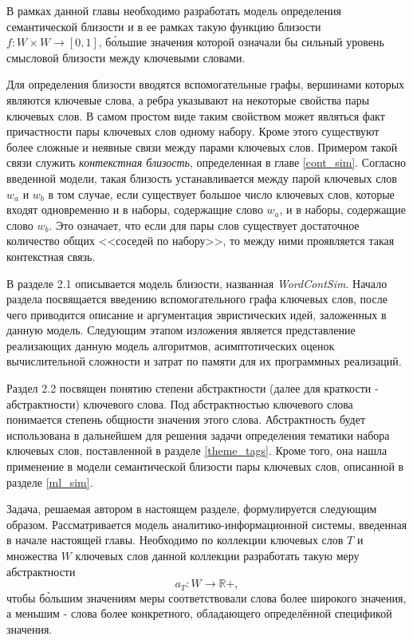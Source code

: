 В рамках данной главы необходимо разработать модель определения семантической близости и в ее рамках такую функцию близости $f : W \times W \rightarrow [0, 1]$, б\'ольшие значения которой означали бы сильный уровень смысловой близости между ключевыми словами.

Для определения близости вводятся вспомогательные графы, вершинами которых являются ключевые слова, а ребра указывают на некоторые свойства пары ключевых слов. В самом простом виде таким свойством может являться факт причастности пары ключевых слов одному набору. Кроме этого существуют более сложные и неявные связи между парами ключевых слов. Примером такой связи служить \emph{контекстная близость}, определенная в главе \ref{cont_sim}. Согласно введенной модели, такая близость устанавливается между парой ключевых слов $w_a$ и $w_b$ в том случае, если существует большое число ключевых слов, которые входят одновременно и в наборы, содержащие слово $w_a$, и в наборы, содержащие слово $w_b$. Это означает, что если для пары слов существует достаточное количество общих <<соседей по набору>>, то между ними проявляется такая контекстная связь.

В разделе 2.1 описывается модель близости, названная \emph{WordContSim}. Начало раздела посвящается введению вспомогательного графа ключевых слов, после чего приводится описание и аргументация эвристических идей, заложенных в данную модель. Следующим этапом изложения является представление реализающих данную модель алгоритмов, асимптотических оценок вычислительной сложности и затрат по памяти для их программных реализаций.

Раздел 2.2 посвящен понятию степени абстрактности (далее для краткости - абстрактности) ключевого слова. Под абстрактностью ключевого слова понимается степень общности значения этого слова. Абстрактность будет использована в дальнейшем для решения задачи определения тематики набора ключевых слов, поставленной в разделе \ref{theme_tags}. Кроме того, она нашла применение в модели семантической близости пары ключевых слов, описанной в разделе \ref{ml_sim}.

Задача, решаемая автором в настоящем разделе, формулируется следующим образом. Рассматривается модель аналитико-информационной системы, введенная в начале настоящей главы. Необходимо по коллекции ключевых слов $T$ и множества $W$ ключевых слов данной коллекции разработать такую меру абстрактности
    $$a_T : W \rightarrow \mathbb{R}+,$$
%
чтобы б\`ольшим значениям меры соответствовали слова более широкого значения, а меньшим - слова более конкретного, обладающего определённой спецификой значения.

